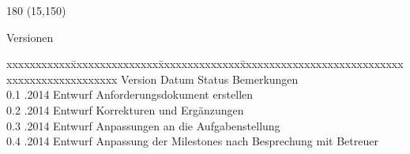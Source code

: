 
\begin{textblock}{180} (15,150)
\color{black}
\begin{huge}
Versionen
\end{huge}
\vspace{10mm}

\fontsize{10pt}{18pt}\selectfont
\begin{tabbing}
xxxxxxxxxxx\=xxxxxxxxxxxxxxx\=xxxxxxxxxxxxxx\=xxxxxxxxxxxxxxxxxxxxxxxxxxxxxxxxxxxxxxxxxxxxxxx \kill
Version	\> Datum	\> Status		\> Bemerkungen		\\
0.1	.2014	\> Entwurf		\> Anforderungsdokument erstellen	\\	
0.2	.2014	\> Entwurf		\> Korrekturen und Ergänzungen	\\	
0.3	.2014	\> Entwurf		\> Anpassungen an die Aufgabenstellung	\\ 
0.4	.2014	\> Entwurf		\> Anpassung der Milestones nach Besprechung mit Betreuer	\\ 
\end{tabbing}

\end{textblock}
